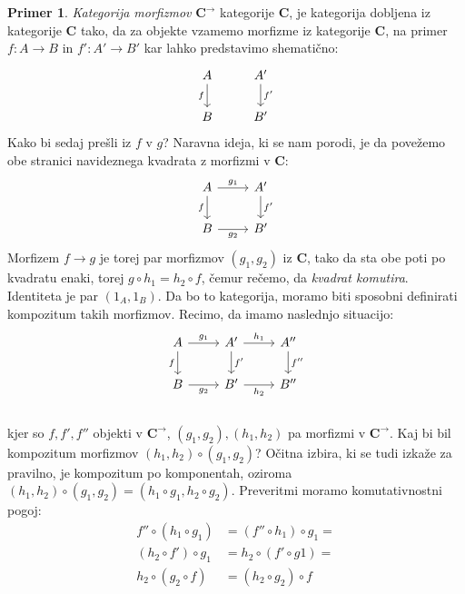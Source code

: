 \documentclass[12pt,a4paper]{book}
\theoremstyle{definition}
\theoremstyle{plain}
\theoremstyle{definition}
\newtheorem{primer}{Primer}[section]
\theoremstyle{remark}
\newcommand{\cat}[1]{\textbf{#1}}
\begin{document}
\begin{primer}
\textit{Kategorija morfizmov} $\cat{C}^{\rightarrow}$ kategorije $\cat{C}$, je kategorija dobljena iz kategorije $\cat{C}$ tako, da za objekte vzamemo morfizme iz kategorije $\cat{C}$, na primer $f : A \to B$ in $f' : A' \to B'$ kar lahko predstavimo shematično:
\[ \begin{tikzcd}
A \arrow[d, "f"'] & A' \arrow[d, "f'"] \\
B & B'
\end{tikzcd} \]
Kako bi sedaj prešli iz $f$ v $g$? Naravna ideja, ki se nam porodi, je da povežemo obe stranici navideznega kvadrata z morfizmi v $\cat{C}$:
\[ \begin{tikzcd}
A \arrow[d, "f"'] \arrow[r, "g_1"] & A' \arrow[d, "f'"] \\
B \arrow[r, "g_2"'] & B'
\end{tikzcd} \]
Morfizem $f \to g$ je torej par morfizmov $(g_1, g_2)$ iz $\cat{C}$, tako da sta obe poti po kvadratu enaki, torej $g \circ h_1 = h_2 \circ f$, čemur rečemo, da \textit{kvadrat komutira}.
Identiteta je par $(1_A, 1_B)$.
Da bo to kategorija, moramo biti sposobni definirati kompozitum takih morfizmov.
Recimo, da imamo naslednjo situacijo:
%
$$\begin{tikzcd}
A \arrow[d, "f"'] \arrow[r, "g_1"] & A' \arrow[d, "f'"] \arrow[r, "h_1"] & A'' \arrow[d, "f''"] \\
B \arrow[r, "g_2"'] & B' \arrow[r, "h_2"'] & B'' \\
\end{tikzcd}$$
%
kjer so $f, f', f''$ objekti v $\cat{C}^{\rightarrow}$, $(g_1, g_2), (h_1,h_2)$ pa morfizmi v $\cat{C}^{\rightarrow}$. Kaj bi bil kompozitum morfizmov $(h_1,h_2) \circ (g_1,g_2)$? Očitna izbira, ki se tudi izkaže za pravilno, je kompozitum po komponentah, oziroma $(h_1,h_2) \circ (g_1,g_2) = (h_1 \circ g_1, h_2 \circ g_2)$. Preveritmi moramo komutativnostni pogoj:
\begin{align*}
f'' \circ (h_1 \circ g_1) &= (f'' \circ h_1) \circ g_1 = \\
(h_2 \circ f') \circ g_1 &= h_2 \circ (f' \circ g1) = \\
h_2 \circ (g_2 \circ f) &= (h_2 \circ g_2) \circ f
\end{align*}

\end{primer}
\end{document}
